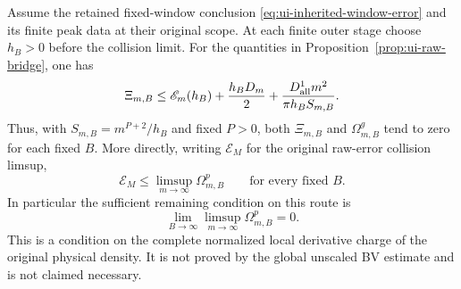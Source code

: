 \begin{proposition}
\label{prop:ui-inherited-bridge}
Assume the retained fixed-window conclusion
\eqref{eq:ui-inherited-window-error} and its finite peak data at
their original scope. At each finite outer stage choose $h_B>0$
before the collision limit. For the quantities in
Proposition~\ref{prop:ui-raw-bridge}, one has
\begin{equation}\label{eq:ui-xi-inherited}
 \Xi_{m,B}\le\mathscr E_m(h_B)+\frac{h_BD_m}{2}
                +\frac{D_{\rm all}^{1}m^2}{\pi h_BS_{m,B}}.
\end{equation}
Thus, with $S_{m,B}=m^{P+2}/h_B$ and fixed $P>0$, both
$\Xi_{m,B}$ and $\Omega^g_{m,B}$ tend to zero for each fixed
$B$. More directly, writing $\mathcal E_M$ for the original
raw-error collision limsup,
\begin{equation}\label{eq:ui-local-charge-suffices}
 \mathcal E_M\le\limsup_{m\to\infty}\Omega^p_{m,B}
                         \qquad\text{for every fixed }B.
\end{equation}
In particular the sufficient remaining condition on this route is
\[
 \lim_{B\to\infty}\limsup_{m\to\infty}\Omega^p_{m,B}=0.
\]
This is a condition on the complete normalized local derivative
charge of the original physical density. It is not proved by the
global unscaled BV estimate and is not claimed necessary.
\end{proposition}
